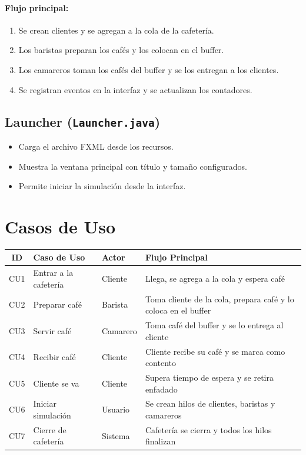 \documentclass[12pt,a4paper]{article}
\begin{document}
\paragraph{Flujo principal:}
\begin{enumerate}
    \item Se crean clientes y se agregan a la cola de la cafetería.
    \item Los baristas preparan los cafés y los colocan en el buffer.
    \item Los camareros toman los cafés del buffer y se los entregan a los clientes.
    \item Se registran eventos en la interfaz y se actualizan los contadores.
\end{enumerate}


\subsection{Launcher (\texttt{Launcher.java})}

\begin{itemize}
    \item Carga el archivo FXML desde los recursos.
    \item Muestra la ventana principal con título y tamaño configurados.
    \item Permite iniciar la simulación desde la interfaz.
\end{itemize}


\section{Casos de Uso}

\begin{longtable}{|c|l|l|l|}
\hline
\textbf{ID} & \textbf{Caso de Uso} & \textbf{Actor} & \textbf{Flujo Principal}  \\ \hline
CU1 & Entrar a la cafetería & Cliente & Llega, se agrega a la cola y espera café  \\ \hline
CU2 & Preparar café & Barista & Toma cliente de la cola, prepara café y lo coloca en el buffer \\ \hline
CU3 & Servir café & Camarero & Toma café del buffer y se lo entrega al cliente \\ \hline
CU4 & Recibir café & Cliente & Cliente recibe su café y se marca como contento \\ \hline
CU5 & Cliente se va & Cliente & Supera tiempo de espera y se retira enfadado \\ \hline
CU6 & Iniciar simulación & Usuario & Se crean hilos de clientes, baristas y camareros \\ \hline
CU7 & Cierre de cafetería & Sistema & Cafetería se cierra y todos los hilos finalizan \\ \hline
\end{longtable}
\end{document}
